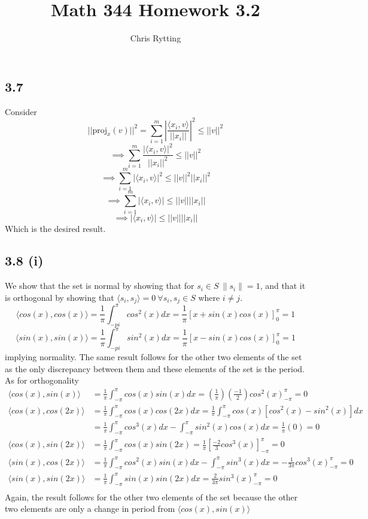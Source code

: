 \documentclass[letterpaper,12pt]{article}
\theoremstyle{definition}
\begin{document}
\title{Math 344 Homework 3.2}
\author{Chris Rytting}
\maketitle

\subsection*{3.7}
Consider 
\[ ||\text{proj}_x(v) ||^2 = \sum^{m}_{i=1} \left| \frac{\langle x_i,v \rangle}{||x_i||}\right|^2 \leq ||v||^2\]
\[\implies \sum^{m}_{i=1}  \frac{|\langle x_i,v \rangle|^2}{||x_i||^2} \leq ||v||^2\]
\[\implies \sum^{m}_{i=1}  |\langle x_i,v \rangle|^2 \leq ||v||^2||x_i||^2\]
\[\implies \sum^{m}_{i=1}  |\langle x_i,v \rangle| \leq ||v||||x_i||\]
\[\implies   |\langle x_i,v \rangle| \leq ||v||||x_i||\]
Which is the desired result.


\subsection*{3.8 (i)}
We show that the set is normal by showing that for $s_i \in S ~ \|s_i\| = 1$, and that it is orthogonal by showing that $\langle s_{i}, s_{j} \rangle = 0 ~ \forall s_{i}, s_{j} \in S$ where $ i \neq j$.\\
\[\langle  cos(x), cos(x)\rangle   = \frac{1}{\pi}\int ^{\pi}_{-pi} cos^2(x)dx = \frac{1}{\pi}[x+sin(x)cos(x)]^\pi_0 = 1\]
\[\langle  sin(x), sin(x)\rangle   = \frac{1}{\pi}\int ^{\pi}_{-pi} sin^2(x)dx = \frac{1}{\pi}[x-sin(x)cos(x)]^\pi_0 = 1\]
implying normality.
The same result follows for the other two elements of the set as the only discrepancy between them and these elements of the set is the period. As for orthogonality
\begin{align*}
\langle  cos(x), sin(x)\rangle   &= \frac{1}{\pi}\int ^\pi_{-\pi} cos(x)sin(x)dx = (\frac{1}{\pi})(\frac{-1}{2}) cos^2(x)_{-\pi}^\pi = 0 \\
\langle  cos(x), cos(2x)\rangle   &= \frac{1}{\pi}\int_{-\pi}^{\pi}cos(x)cos(2x)dx=\frac{1}{\pi}\int_{-\pi}^{\pi}cos(x)[cos^2(x)-sin^2(x)]dx \\
&=\frac{1}{\pi}\int_{-\pi}^{\pi}cos^3(x)dx-\int_{-\pi}^{\pi}sin^2(x)cos(x)dx = \frac{1}{\pi}(0)=0 \\
\langle  cos(x), sin(2x) \rangle   &= \frac{1}{\pi}\int_{-\pi}^{\pi}cos(x)sin(2x)=\frac{1}{\pi}[\frac{-2}{3}cos^3(x)]_{-\pi}^\pi=0 \\
\langle  sin(x), cos(2x) \rangle   &= \frac{1}{\pi}\int_{-\pi}^{\pi}cos^2(x)sin(x)dx-\int_{-\pi}^{\pi}sin^3(x)dx= -\frac{1}{3\pi}cos^3(x)_{-\pi}^\pi = 0 \\
\langle  sin(x),sin(2x)\rangle  &= \frac{1}{\pi}\int_{-\pi}^{\pi}sin(x)sin(2x)dx=\frac{2}{3\pi}sin^3(x)_{-\pi}^\pi = 0 \\
\end{align*}
Again, the result follows for the other two elements of the set because the other two elements are only a change in period from $\langle cos(x),sin(x) \rangle$
\end{document}
